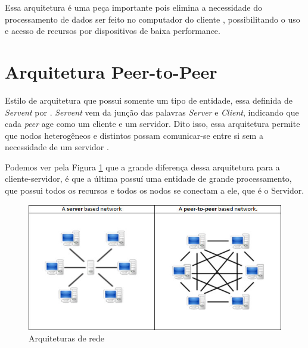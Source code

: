 Essa arquitetura é uma peça importante pois elimina a necessidade do processamento de dados ser feito no computador do cliente \cite{clientserver1996}, possibilitando o uso e acesso de recursos por dispositivos de baixa performance.

\section{Arquitetura Peer-to-Peer}

Estilo de arquitetura que possui somente um tipo de entidade, essa definida de \textit{Servent} por \cite[Sec.~2]{p2pdefinition2001}. \textit{Servent} vem da junção das palavras \textit{Server} e \textit{Client}, indicando que cada \textit{peer} age como um cliente e um servidor. Dito isso, essa arquitetura permite que nodos heterogêneos e distintos possam comunicar-se entre si sem a necessidade de um servidor \cite{p2pgnutella2001}. 
 
Podemos ver pela Figura \ref{fig:clientserver_p2p} que a grande diferença dessa arquitetura para a cliente-servidor, é que a última possuí uma entidade de grande processamento, que possui todos os recursos e todos os nodos se conectam a ele, que é o Servidor.

\begin{figure}[ht!]
	\centering
		\includegraphics[scale=0.35]{figures/p2p-networks.jpg} 
	\caption{Arquiteturas de rede}
	\label{fig:clientserver_p2p}
\end{figure}


